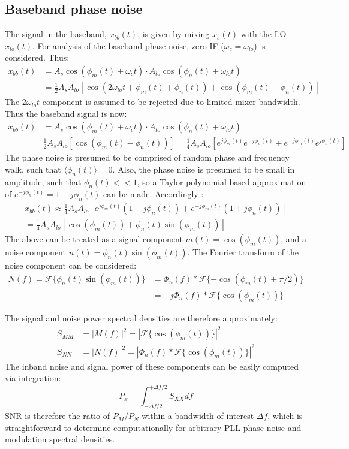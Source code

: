 	\subsection{Baseband phase noise}
		The signal in the baseband, $x_{bb}(t)$, is given by mixing $x_{s}(t)$ with the LO $x_{lo}(t)$. For analysis of the baseband phase noise, zero-IF ($\omega_{c}=\omega_{lo}$) is considered. Thus:
		\begin{align}
			x_{bb}(t) & = A_s\cos(\phi_m(t)+\omega_ct)\cdot A_{lo}\cos(\phi_n(t)+\omega_{lo}t) \\
			& = \frac{1}{2}A_sA_{lo}\left[\cos(2\omega_{lo}t + \phi_m(t) + \phi_n(t)) +  \cos(\phi_m(t) - \phi_n(t))\right] 
		\end{align} 
		The $2\omega_{lo}t$ component is assumed to be rejected due to limited mixer bandwidth. Thus the baseband signal is now:
		\begin{align}
			x_{bb}(t) &= A_s\cos(\phi_m(t)+\omega_ct)\cdot A_{lo}\cos(\phi_n(t)+\omega_{lo}t)\\
			= & \frac{1}{2}A_sA_{lo}\left[\cos(\phi_m(t) - \phi_n(t))\right] = \frac{1}{4}A_sA_{lo}\left[e^{j\phi_m(t)} e^{-j\phi_n(t)} + e^{-j\phi_m(t)} e^{j\phi_n(t)}\right] 
		\end{align} 
		The phase noise is presumed to be comprised of random phase and frequency walk, such that $\langle\phi_n(t)\rangle = 0$. Also, the phase noise is presumed to be small in amplitude, such that $\phi_n(t) << 1$, so a Taylor polynomial-based approximation of $e^{-j\phi_n(t)} = 1 -j\phi_n(t)$ can be made. Accordingly :
		\begin{align}
			x_{bb}(t) \approx \frac{1}{4}A_sA_{lo}\left[e^{j\phi_m(t)}(1 -j\phi_n(t))+ e^{-j\phi_m(t)}(1+j\phi_n(t))\right] \\
			= \frac{1}{4}A_sA_{lo}\left[\cos(\phi_m(t)) + \phi_n(t)\sin(\phi_m(t))\right]
		\end{align} 
		The above can be treated as a signal component $m(t) = \cos(\phi_m(t))$, and a noise component $n(t) = \phi_n(t)\sin(\phi_m(t))$. The Fourier transform of the noise component can be considered:
		\begin{align}
			N(f) = \mathcal{F}\{\phi_n(t)\sin(\phi_m(t))\} &= \Phi_n(f)*\mathcal{F}\{-\cos(\phi_m(t)+\pi/2)\}\\
			& =-j\Phi_n(f)*\mathcal{F}\{\cos(\phi_m(t))\}
		\end{align}

		The signal and noise power spectral densities are therefore approximately:
		\begin{align}
			S_{MM} &= |M(f)|^2 = |\mathcal{F}\{\cos(\phi_m(t))\}|^2\\
			S_{NN} &= |N(f)|^2 = |\Phi_n(f)*\mathcal{F}\{\cos(\phi_m(t))\}|^2
		\end{align}
		The inband noise and signal power of these components can be easily computed via integration:
		\begin{equation}
			P_x = \int^{+\Delta f/2}_{-\Delta f/2}S_{XX}df
		\end{equation}
		SNR is therefore the ratio of $P_M/P_N$ within a bandwidth of interest $\Delta f$, which is straightforward to determine computationally for arbitrary PLL phase noise and modulation spectral densities.


    \pagebreak
	\printbibliography


	\pagebreak
	


